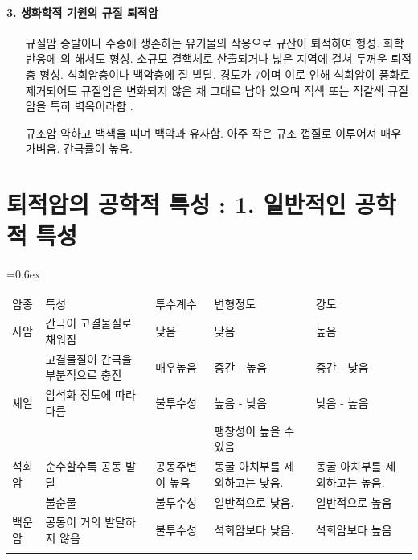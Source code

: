 \documentclass[12pt, a4paper, twoside]{book}
\begin{document}
		\paragraph{3. 생화학적 기원의 규질 퇴적암}
			\begin{itemize}[topsep=0.0em, parsep=0.0em, itemsep=0em, leftmargin=10.0em, labelwidth=3em, labelsep=3em] 
			\item [규질암]			증발이나 수중에 생존하는 유기물의 작용으로 규산이 퇴적하여 형성. 화학반응에 의   해서도 형성. 
								소규모 결핵체로 산출되거나 넓은 지역에 걸쳐 두꺼운 퇴적층 형성. 
								석회암층이나 백악층에 잘 발달. 경도가 7이며 이로 인해 석회암이 풍화로 제거되어도   규질암은 변화되지 않은 채 그대로 남아 있으며 적색 또는 적갈색 규질암을 특히 벽옥이라함 .
			\item [규조암]			약하고 백색을 띠며 백악과 유사함. 아주 작은 규조 껍질로 이루어져 매우 가벼움.    간극률이 높음. 
			\end{itemize}



	\clearpage
	\section{퇴적암의 공학적 특성 : 1. 일반적인 공학적 특성}


			
				\tabulinesep=0.6ex
				\begin{tabu} to 1.0\textwidth { X[l, 2.0] X[l, 4.0] X[l, 3.0] X[l, 4.0] X[l, 3.0]}
				\tabucline[0.2ex]{-}		
				암종			&특성								&투수계수			&변형정도							&강도				\\
				\tabucline[0.1ex]{-}	
				사암			&간극이 고결물질로 채워짐				&낮음			&낮음							&높음				\\
							&고결물질이 간극을 부분적으로 충진			&매우높음			&중간 - 높음						&중간 - 낮음				\\
				\tabucline[0.1ex]{-}		
				셰일			&암석화 정도에 따라 다름					&불투수성			&높음 - 낮음						&낮음 - 높음				\\
							&									&				&팽창성이 높을 수 있음				&				\\
				\tabucline[0.1ex]{-}		
				석회암		&순수할수록 공동 발달					&공동주변이 높음	&동굴 아치부를 제외하고는 낮음.		&동굴 아치부를 제외하고는 높음.				\\
							&불순물								&불투수성			&일반적으로 낮음.					&일반적으로 높음				\\
				\tabucline[0.1ex]{-}		
				백운암		&공동이 거의 발달하지 않음				&불투수성			&석회암보다 낮음.					&석회암보다 높음				\\ 
				\tabucline[0.1ex]{-}		
				\end{tabu} 
\end{document}
